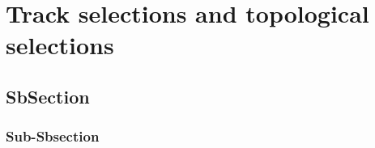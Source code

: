 \newpage
\section{Track selections and topological selections}
\label{sec:Section04}

\subsection{SbSection}
\label{sec:Section04.a-}

\subsubsection{Sub-Sbsection}